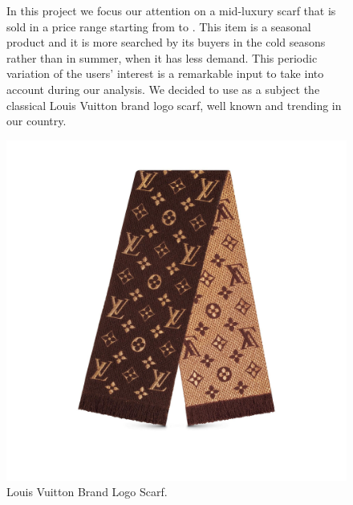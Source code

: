 \begin{figure}[!htp] 
	\begin{flushleft}
		In this project we focus our attention on a mid-luxury scarf that is sold in a price range starting from  to . This item is a seasonal product and it is more searched by its buyers in the cold seasons rather than in summer, when it has less demand. This periodic variation of the users' interest is a remarkable input to take into account during our analysis. We decided to use as a subject the classical Louis Vuitton brand logo scarf, well known and trending in our country.
	\end{flushleft}
	\centering
	\includegraphics[width=0.8\linewidth]{sections/images/productLogo}
	\caption{Louis Vuitton Brand Logo Scarf.}
\end{figure}
\clearpage